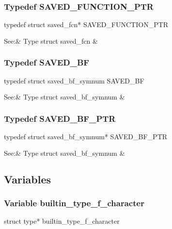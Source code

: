 \subsubsection{Typedef SAVED\_FUNCTION\_PTR}
\label{type_SAVED_FUNCTION_PTR_f-lang.c}

{\stt typedef struct saved\_fcn* SAVED\_FUNCTION\_PTR}

\smallskip
\begin{cxreftabii}
See:& Type struct saved\_fcn & \\
\end{cxreftabii}


\subsubsection{Typedef SAVED\_BF}
\label{type_SAVED_BF_f-lang.c}

{\stt typedef struct saved\_bf\_symnum SAVED\_BF}

\smallskip
\begin{cxreftabii}
See:& Type struct saved\_bf\_symnum & \\
\end{cxreftabii}


\subsubsection{Typedef SAVED\_BF\_PTR}
\label{type_SAVED_BF_PTR_f-lang.c}

{\stt typedef struct saved\_bf\_symnum* SAVED\_BF\_PTR}

\smallskip
\begin{cxreftabii}
See:& Type struct saved\_bf\_symnum & \\
\end{cxreftabii}


\subsection{Variables}


\subsubsection{Variable builtin\_type\_f\_character}
\label{var_builtin_type_f_character_f-lang.c}

{\stt struct type* builtin\_type\_f\_character}

